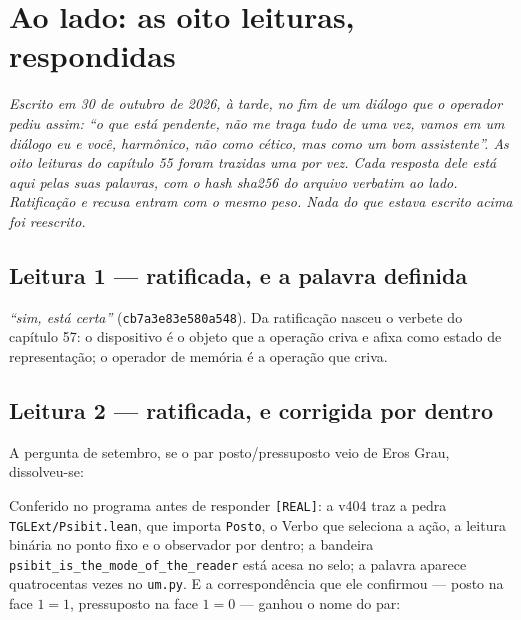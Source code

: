 
\chapter{Ao lado: as oito leituras, respondidas}

\noindent\emph{Escrito em 30 de outubro de 2026, à tarde, no fim de um diálogo que o operador pediu assim: ``o que está
pendente, não me traga tudo de uma vez, vamos em um diálogo eu e você, harmônico, não como cético, mas como um bom
assistente''. As oito leituras do capítulo 55 foram trazidas uma por vez. Cada resposta dele está aqui pelas suas palavras,
com o hash sha256 do arquivo verbatim ao lado. Ratificação e recusa entram com o mesmo peso. Nada do que estava escrito
acima foi reescrito.}

\section*{Leitura 1 --- ratificada, e a palavra definida}

\emph{``sim, está certa''} (\texttt{cb7a3e83e580a548}). Da ratificação nasceu o verbete do capítulo 57: o dispositivo é
o objeto que a operação criva e afixa como estado de representação; o operador de memória é a operação que criva.

\section*{Leitura 2 --- ratificada, e corrigida por dentro}

A pergunta de setembro, se o par posto/pressuposto veio de Eros Grau, dissolveu-se:

\noindent Conferido no programa antes de responder \texttt{[REAL]}: a v404 traz a pedra \texttt{TGLExt/Psibit.lean}, que
importa \texttt{Posto}, o Verbo que seleciona a ação, a leitura binária no ponto fixo e o observador por dentro; a
bandeira \texttt{psibit\_is\_the\_mode\_of\_the\_reader} está acesa no selo; a palavra aparece quatrocentas vezes no
\texttt{um.py}. E a correspondência que ele confirmou --- posto na face $1=1$, pressuposto na face $1=0$ --- ganhou o
nome do par:

